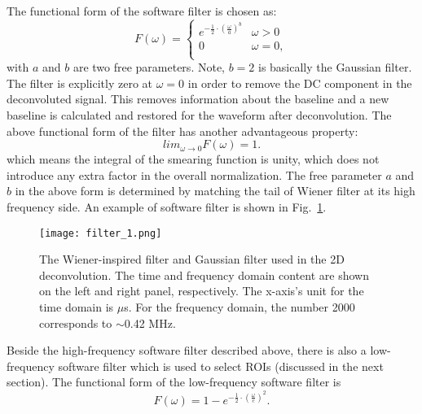 The functional form of the software filter is chosen as:
\begin{equation}
F(\omega) = 
\begin{cases}
e^{- \frac{1}{2} \cdot \left( \frac{\omega}{a} \right)^b} &  \omega >0 \\
0 &  \omega = 0, \\
\end{cases}
\end{equation}
with $a$ and $b$ are two free parameters. 
Note, $b=2$ is basically the Gaussian filter. 
The filter is explicitly zero at $\omega = 0$ in order to remove the DC component in the deconvoluted signal. 
This removes information about the baseline and a new baseline is calculated and restored for the waveform after 
deconvolution. The above functional form of the filter has another advantageous property:
\begin{equation}
lim_{\omega \rightarrow 0} F(\omega) = 1.
\end{equation}
which means the integral of the smearing function is unity, which does not introduce any
extra factor in the overall normalization. The free parameter $a$ and $b$ in the above 
form is determined by matching the tail of Wiener filter at its high frequency side. 
An example of software filter is shown in Fig.~\ref{fig:soft_filter_1}. 

\begin{figure}[!h!tbp]
\texttt{[image: filter\_1.png]}
\caption{The Wiener-inspired filter and Gaussian filter used in the 2D deconvolution. 
The time and frequency domain content are shown on the left and right panel, respectively.
The x-axis's unit for the time domain is $\mu$s. For the frequency domain, the number 2000
corresponds to $\sim$0.42 MHz.}
\label{fig:soft_filter_1}
\end{figure}

Beside the high-frequency software filter described above, there is also a low-frequency 
software filter which is used to select ROIs (discussed in the next section). 
The functional form of the low-frequency software filter is 
\begin{equation}
F(\omega) = 1- e^{-\frac{1}{2}\cdot \left( \frac{\omega}{c} \right)^2}.
\end{equation}

